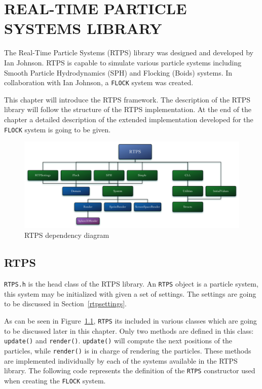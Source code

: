 \chapter{REAL-TIME PARTICLE SYSTEMS LIBRARY}\label{RTPSchapter}

The Real-Time Particle Systems (RTPS) library was designed and developed by Ian Johnson\cite{ianPaper}. RTPS is capable to simulate various particle systems including Smooth Particle Hydrodynamics (SPH) and Flocking (Boids) systems. In collaboration with Ian Johnson, a \texttt{FLOCK} system was created.

This chapter will introduce the RTPS framework. The description of the RTPS library will follow the structure of the RTPS implementation. At the end of the chapter a detailed description of the extended implementation developed for the \texttt{FLOCK} system is going to be given. 

\begin{figure}[htbp]
\begin{center}
\includegraphics[scale=0.30]{figures/RTPSdiagram.pdf}
\caption{RTPS dependency diagram}
\label{RTPSdiagram}
\end{center}
\end{figure}

\section{RTPS}\label{rtpssection}
\texttt{RTPS.h} is the head class of the RTPS library. An \texttt{RTPS} object is a particle system, this system may be initialized with given a set of settings. The settings are going to be discussed in Section~\ref{rtpsettings}. 

As can be seen in Figure~\ref{RTPSdiagram}, \texttt{RTPS} its included in various classes which are going to be discussed later in this chapter. Only two methods are defined in this class: \texttt{update()} and \texttt{render()}. \texttt{update()} will compute the next positions of the particles, while \texttt{render()} is in charge of rendering the particles. These methods are implemented individually by each of the systems available in the RTPS library. The following code represents the definition of the \texttt{RTPS} constructor used when creating the \texttt{FLOCK} system.

